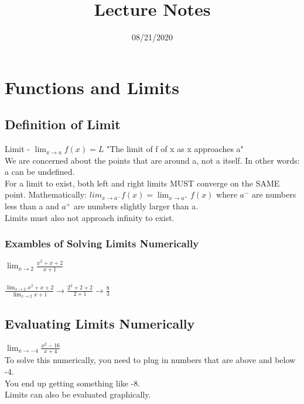 \documentclass{article}
\begin{document}
\title{Lecture Notes}
\date{08/21/2020}
\maketitle

\section{Functions and Limits}

\subsection{Definition of Limit}
Limit - $\lim_{x \to a}f(x)=L$ "The limit of f of x as x approaches a"\\
We are concerned about the points that are around a, not a itself. In other words: a can be undefined.\\
For a limit to exist, both left and right limits MUST converge on the SAME point.
Mathematically: $lim_{x \to a^-}f(x) = \lim_{x \to a^+}f(x)$ where $a^-$ are numbers less than a and $a^+$ are numbers slightly larger than a.\\
Limits must also not approach infinity to exist.

\subsubsection{Exambles of Solving Limits Numerically}
$\lim_{x \to 2}\frac{x^2+x+2}{x+1}$\\
\\
$\frac{\lim_{x \to 2}x^2+x+2}{\lim_{x \to 2}x+1} \to
\frac{2^2+2+2}{2+1} \to \frac{8}{3}$

\subsection{Evaluating Limits Numerically}
$\lim_{x \to -4}\frac{x^2-16}{x+4}$\\
To solve this numerically, you need to plug in numbers that are above and below -4.\\
You end up getting something like -8.\\
Limits can also be evaluated graphically.
\end{document}

